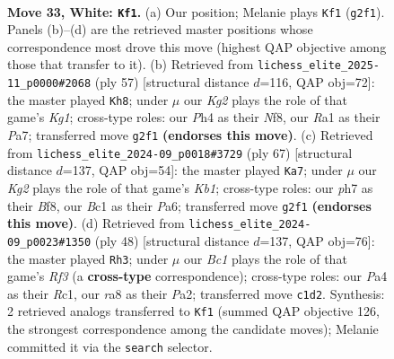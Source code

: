 \documentclass[11pt]{article}
\begin{document}
\clearpage

\begin{figure}[p]\centering
\begin{subfigure}{0.46\textwidth}\centering
\resizebox{\linewidth}{!}{%
\newchessgame
\chessboard[
  setfen={r1bq2k1/3pr1bp/p3p3/5p1B/P1np1Q1P/5N2/1P3PK1/RNBR4 w - - 0 33},
  showmover=false,
  pgfstyle=straightmove, color=movearrow, markmove={g2-f1}
]}
\caption{}
\end{subfigure}\hfill
\begin{subfigure}{0.46\textwidth}\centering
\resizebox{\linewidth}{!}{%
\newchessgame
\chessboard[
  setfen={4rnk1/pp3bpn/8/3qPP2/P2P2P1/2Q5/2BB1R1P/R5K1 b - - 0 29},
  showmover=false,
  pgfstyle=straightmove, color=movearrow, markmove={g8-h8}
]}
\caption{}
\end{subfigure}
\\[4pt]
\begin{subfigure}{0.46\textwidth}\centering
\resizebox{\linewidth}{!}{%
\newchessgame
\chessboard[
  setfen={1k3b2/1b6/pnr1p1Q1/qn1pP1P1/1p1P4/1P6/P1P1N2P/1KB2B1R b - - 0 34},
  showmover=false,
  pgfstyle=straightmove, color=movearrow, markmove={b8-a7}
]}
\caption{}
\end{subfigure}\hfill
\begin{subfigure}{0.46\textwidth}\centering
\resizebox{\linewidth}{!}{%
\newchessgame
\chessboard[
  setfen={5nrk/1r2bppp/p3p3/1q2P3/1p1B1NQ1/1P3R2/P5PP/2R4K w - - 5 25},
  showmover=false,
  pgfstyle=straightmove, color=movearrow, markmove={f3-h3}
]}
\caption{}
\end{subfigure}
\caption{\textbf{Move 33, White: \texttt{Kf1}.} (a) Our position; Melanie plays \texttt{Kf1} (\texttt{g2f1}). Panels (b)--(d) are the retrieved master positions whose correspondence most drove this move (highest QAP objective among those that transfer to it). (b) Retrieved from \texttt{lichess\_elite\_2025-11\_p0000\#2068} (ply 57) [structural distance $d$=116, QAP obj=72]: the master played \texttt{Kh8}; under $\mu$ our \emph{Kg2} plays the role of that game's \emph{Kg1}; cross-type roles: our \emph{P}h4 as their \emph{N}f8, our \emph{R}a1 as their \emph{P}a7; transferred move \texttt{g2f1} \textbf{(endorses this move)}. (c) Retrieved from \texttt{lichess\_elite\_2024-09\_p0018\#3729} (ply 67) [structural distance $d$=137, QAP obj=54]: the master played \texttt{Ka7}; under $\mu$ our \emph{Kg2} plays the role of that game's \emph{Kb1}; cross-type roles: our \emph{p}h7 as their \emph{B}f8, our \emph{B}c1 as their \emph{P}a6; transferred move \texttt{g2f1} \textbf{(endorses this move)}. (d) Retrieved from \texttt{lichess\_elite\_2024-09\_p0023\#1350} (ply 48) [structural distance $d$=137, QAP obj=76]: the master played \texttt{Rh3}; under $\mu$ our \emph{Bc1} plays the role of that game's \emph{Rf3} (a \textbf{cross-type} correspondence); cross-type roles: our \emph{P}a4 as their \emph{R}c1, our \emph{r}a8 as their \emph{P}a2; transferred move \texttt{c1d2}. Synthesis: 2 retrieved analogs transferred to \texttt{Kf1} (summed QAP objective 126, the strongest correspondence among the candidate moves); Melanie committed it via the \texttt{search} selector.}
\label{fig:thought-m64}
\end{figure}
\end{document}
